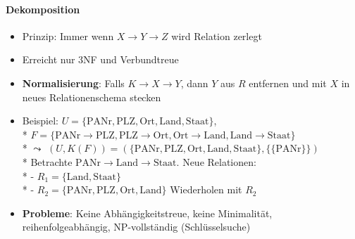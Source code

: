 \paragraph{Dekomposition}
\begin{itemize}
	\item Prinzip: Immer wenn \( X \to Y \to Z \) wird Relation zerlegt
	\item Erreicht nur 3NF und Verbundtreue
	\item \textbf{Normalisierung}: Falls \( K \to X \to Y \), dann \( Y \) aus \( R \) entfernen und mit \( X \) in neues Relationenschema stecken
	\item Beispiel: \( U = \{ \text{PANr}, \text{PLZ}, \text{Ort}, \text{Land}, \text{Staat} \} \), \\*
	\( F = \{ \text{PANr} \to \text{PLZ}, \text{PLZ} \to \text{Ort}, \text{Ort} \to \text{Land}, \text{Land} \to \text{Staat} \} \) \\*
	\( \leadsto \) \( (U,K(F)) = (\{ \text{PANr}, \text{PLZ}, \text{Ort}, \text{Land}, \text{Staat} \}, \{ \{ \text{PANr} \} \}) \) \\*
	Betrachte \( \text{PANr} \to \text{Land} \to \text{Staat} \). Neue Relationen: \\*
		- \( R_1 = \{ \text{Land}, \text{Staat} \} \) \\*
		- \( R_2 = \{ \text{PANr}, \text{PLZ}, \text{Ort}, \text{Land} \} \)
	Wiederholen mit \( R_2 \)
	\item \textbf{Probleme}: Keine Abhängigkeitstreue, keine Minimalität, reihenfolgeabhängig, NP-vollständig (Schlüsselsuche)
\end{itemize}



